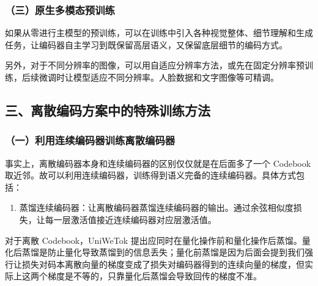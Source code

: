 \hypertarget{ux4e09ux539fux751fux591aux6a21ux6001ux9884ux8badux7ec3}{%
\subsubsection{（三）原生多模态预训练}\label{ux4e09ux539fux751fux591aux6a21ux6001ux9884ux8badux7ec3}}

如果从零进行主模型的预训练，可以在训练中引入各种视觉整体、细节理解和生成任务，让编码器自主学习到既保留高层语义，又保留底层细节的编码方式。

另外，对于不同分辨率的图像，可以用自适应分辨率方法，或先在固定分辨率预训练，后续微调时让模型适应不同分辨率。人脸数据和文字图像等可精调。

\hypertarget{ux4e09ux79bbux6563ux7f16ux7801ux65b9ux6848ux4e2dux7684ux7279ux6b8aux8badux7ec3ux65b9ux6cd5}{%
\subsection{三、离散编码方案中的特殊训练方法}\label{ux4e09ux79bbux6563ux7f16ux7801ux65b9ux6848ux4e2dux7684ux7279ux6b8aux8badux7ec3ux65b9ux6cd5}}

\hypertarget{ux4e00ux5229ux7528ux8fdeux7eedux7f16ux7801ux5668ux8badux7ec3ux79bbux6563ux7f16ux7801ux5668}{%
\subsubsection{（一）利用连续编码器训练离散编码器}\label{ux4e00ux5229ux7528ux8fdeux7eedux7f16ux7801ux5668ux8badux7ec3ux79bbux6563ux7f16ux7801ux5668}}

事实上，离散编码器本身和连续编码器的区别仅仅就是在后面多了一个 Codebook 取近邻。故可以利用连续编码器，训练得到语义完备的连续编码器。具体方式包括：

\begin{enumerate}
\def\labelenumi{\arabic{enumi}.}
\tightlist
\item
  蒸馏连续编码器：让离散编码器蒸馏连续编码器的输出。通过余弦相似度损失，让每一层激活值接近连续编码器对应层激活值。
\end{enumerate}

对于离散 Codebook，UniWeTok 提出应同时在量化操作前和量化操作后蒸馏。量化后蒸馏是防止量化导致蒸馏到的信息丢失；量化前蒸馏是因为后面会提到我们强行让损失对码本离散向量的梯度变成了损失对编码器得到的连续向量的梯度，但实际上这两个梯度是不等的，只靠量化后蒸馏会导致回传的梯度不准。

